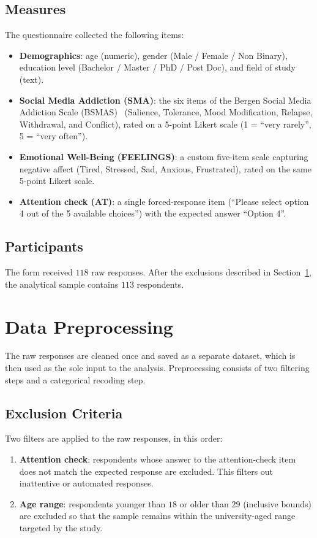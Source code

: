 \documentclass{article}
\begin{document}
\subsection{Measures}
The questionnaire collected the following items:
\begin{itemize}
    \item \textbf{Demographics}: age (numeric), gender (Male / Female /
        Non Binary), education level (Bachelor / Master / PhD / Post Doc),
        and field of study (text).

    \item \textbf{Social Media Addiction (SMA)}: the six items of the
        Bergen Social Media Addiction Scale
        (BSMAS)~\parencite{andreassen2016relationship,leung2020measurement}
        (Salience, Tolerance, Mood Modification, Relapse, Withdrawal, and
        Conflict), rated on a 5-point Likert scale (1 = ``very rarely'',
        5 = ``very often'').

    \item \textbf{Emotional Well-Being (FEELINGS)}: a custom five-item
        scale capturing negative affect (Tired, Stressed, Sad, Anxious,
        Frustrated), rated on the same 5-point Likert scale.

    \item \textbf{Attention check (AT)}: a single forced-response item
        (``Please select option 4 out of the 5 available choices'') with
        the expected answer ``Option 4''.
\end{itemize}

\subsection{Participants}
The form received $118$ raw responses. After the exclusions described in
Section~\ref{sec:preprocessing}, the analytical sample contains $113$
respondents.

\section{Data Preprocessing}
\label{sec:preprocessing}

The raw responses are cleaned once and saved as a separate dataset, which
is then used as the sole input to the analysis. Preprocessing consists of
two filtering steps and a categorical recoding step.

\subsection{Exclusion Criteria}
Two filters are applied to the raw responses, in this order:
\begin{enumerate}
    \item \textbf{Attention check}: respondents whose answer to the
        attention-check item does not match the expected response are
        excluded. This filters out inattentive or automated responses.
    \item \textbf{Age range}: respondents younger than $18$ or older than
        $29$ (inclusive bounds) are excluded so that the sample remains
        within the university-aged range targeted by the study.
\end{enumerate}
\end{document}
